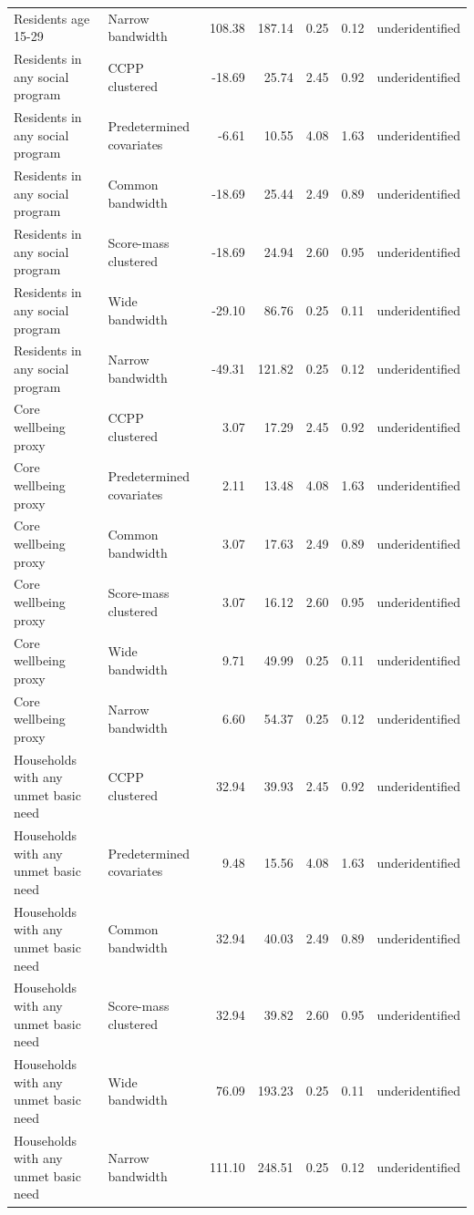 \begin{table}[!htbp]
{\begin{tabular}{llrrrrl}
Residents age 15-29 & Narrow bandwidth & 108.38 & 187.14 & 0.25 & 0.12 & underidentified \\
Residents in any social program & CCPP clustered & -18.69 & 25.74 & 2.45 & 0.92 & underidentified \\
Residents in any social program & Predetermined covariates & -6.61 & 10.55 & 4.08 & 1.63 & underidentified \\
Residents in any social program & Common bandwidth & -18.69 & 25.44 & 2.49 & 0.89 & underidentified \\
Residents in any social program & Score-mass clustered & -18.69 & 24.94 & 2.60 & 0.95 & underidentified \\
Residents in any social program & Wide bandwidth & -29.10 & 86.76 & 0.25 & 0.11 & underidentified \\
Residents in any social program & Narrow bandwidth & -49.31 & 121.82 & 0.25 & 0.12 & underidentified \\
Core wellbeing proxy & CCPP clustered & 3.07 & 17.29 & 2.45 & 0.92 & underidentified \\
Core wellbeing proxy & Predetermined covariates & 2.11 & 13.48 & 4.08 & 1.63 & underidentified \\
Core wellbeing proxy & Common bandwidth & 3.07 & 17.63 & 2.49 & 0.89 & underidentified \\
Core wellbeing proxy & Score-mass clustered & 3.07 & 16.12 & 2.60 & 0.95 & underidentified \\
Core wellbeing proxy & Wide bandwidth & 9.71 & 49.99 & 0.25 & 0.11 & underidentified \\
Core wellbeing proxy & Narrow bandwidth & 6.60 & 54.37 & 0.25 & 0.12 & underidentified \\
Households with any unmet basic need & CCPP clustered & 32.94 & 39.93 & 2.45 & 0.92 & underidentified \\
Households with any unmet basic need & Predetermined covariates & 9.48 & 15.56 & 4.08 & 1.63 & underidentified \\
Households with any unmet basic need & Common bandwidth & 32.94 & 40.03 & 2.49 & 0.89 & underidentified \\
Households with any unmet basic need & Score-mass clustered & 32.94 & 39.82 & 2.60 & 0.95 & underidentified \\
Households with any unmet basic need & Wide bandwidth & 76.09 & 193.23 & 0.25 & 0.11 & underidentified \\
Households with any unmet basic need & Narrow bandwidth & 111.10 & 248.51 & 0.25 & 0.12 & underidentified \\

\end{tabular}}
\end{table}
